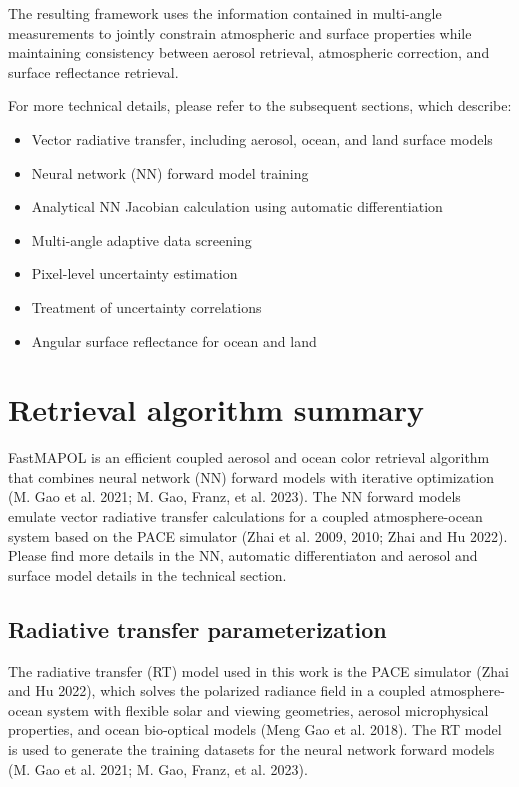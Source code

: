 \documentclass[
  11pt,
  letterpaper,
  DIV=11,
  numbers=noendperiod]{scrreprt}
\providecommand{\tightlist}{%
  \setlength{\itemsep}{0pt}\setlength{\parskip}{0pt}}
\begin{document}
The resulting framework uses the information contained in multi-angle
measurements to jointly constrain atmospheric and surface properties
while maintaining consistency between aerosol retrieval, atmospheric
correction, and surface reflectance retrieval.

For more technical details, please refer to the subsequent sections,
which describe:

\begin{itemize}
\tightlist
\item
  Vector radiative transfer, including aerosol, ocean, and land surface
  models
\item
  Neural network (NN) forward model training
\item
  Analytical NN Jacobian calculation using automatic differentiation
\item
  Multi-angle adaptive data screening
\item
  Pixel-level uncertainty estimation
\item
  Treatment of uncertainty correlations
\item
  Angular surface reflectance for ocean and land
\end{itemize}


\chapter{Retrieval algorithm summary}\label{retrieval-algorithm-summary}

FastMAPOL is an efficient coupled aerosol and ocean color retrieval
algorithm that combines neural network (NN) forward models with
iterative optimization (M. Gao et al. 2021; M. Gao, Franz, et al. 2023).
The NN forward models emulate vector radiative transfer calculations for
a coupled atmosphere-ocean system based on the PACE simulator (Zhai et
al. 2009, 2010; Zhai and Hu 2022). Please find more details in the NN,
automatic differentiaton and aerosol and surface model details in the
technical section.

\section{Radiative transfer
parameterization}\label{radiative-transfer-parameterization}

The radiative transfer (RT) model used in this work is the PACE
simulator (Zhai and Hu 2022), which solves the polarized radiance field
in a coupled atmosphere-ocean system with flexible solar and viewing
geometries, aerosol microphysical properties, and ocean bio-optical
models (Meng Gao et al. 2018). The RT model is used to generate the
training datasets for the neural network forward models (M. Gao et al.
2021; M. Gao, Franz, et al. 2023).
\end{document}
